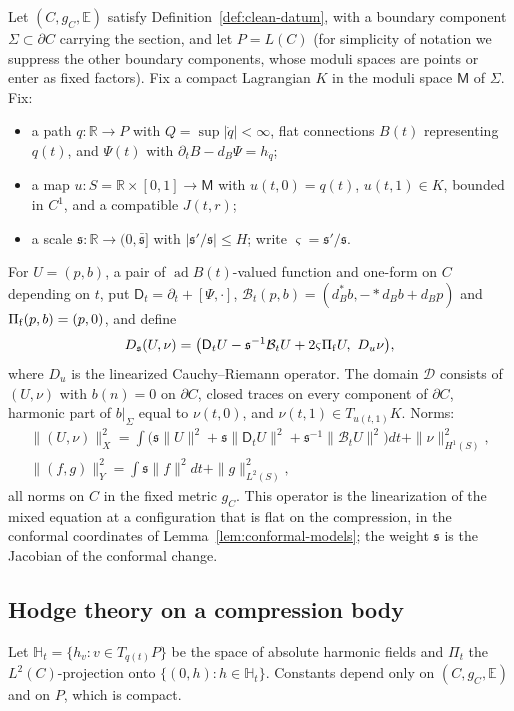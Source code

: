 \documentclass[11pt]{amsart}
\theoremstyle{definition}
\theoremstyle{remark}
\theoremstyle{plain}
\numberwithin{equation}{section}
\newcommand{\RR}{\mathbb{R}}
\newcommand{\ad}{\operatorname{ad}}
\newcommand{\Msf}{\mathsf{M}}
\begin{document}
Let $(C,g_C,\mathbb E)$ satisfy Definition~\ref{def:clean-datum}, with a boundary
component $\Sigma\subset\partial C$ carrying the section, and let $P=L(C)$
(for simplicity of notation we suppress the other boundary components,
whose moduli spaces are points or enter as fixed factors). Fix a
compact Lagrangian $K$ in the moduli space $\Msf$ of $\Sigma$. Fix:
\begin{itemize}[leftmargin=2em]
\item a path $q\colon\RR\to P$ with $Q=\sup|\dot q|<\infty$, flat
  connections $B(t)$ representing $q(t)$, and $\Psi(t)$ with
  $\partial_tB-d_B\Psi=h_{\dot q}$;
\item a map $u\colon S=\RR\times[0,1]\to\Msf$ with $u(t,0)=q(t)$,
  $u(t,1)\in K$, bounded in $C^1$, and a compatible $J(t,r)$;
\item a scale ${\mathfrak s}\colon\RR\to(0,\bar{\mathfrak s}]$ with $|{\mathfrak s}'/{\mathfrak s}|\le H$;
  write $\varsigma={\mathfrak s}'/{\mathfrak s}$.
\end{itemize}
For $U=(p,b)$, a pair of $\ad B(t)$-valued function and one-form on $C$
depending on $t$, put $\mathsf D_t=\partial_t+[\Psi,\cdot]$,
$\mathcal B_t(p,b)=(d_B^*b,-*d_Bb+d_Bp)$ and $\Pi_{\rm f}(p,b)=(p,0)$, and
define
\[
D_{\mathfrak s}(U,\nu)=\bigl(\mathsf D_tU-{\mathfrak s}^{-1}\mathcal B_tU+2\varsigma\Pi_{\rm f}U,\
D_u\nu\bigr),
\]
where $D_u$ is the linearized Cauchy--Riemann operator. The domain
$\mathcal D$ consists of $(U,\nu)$ with $b(n)=0$ on $\partial C$, closed
traces on every component of $\partial C$, harmonic part of
$b|_\Sigma$ equal to $\nu(t,0)$, and $\nu(t,1)\in T_{u(t,1)}K$. Norms:
\begin{gather*}
\|(U,\nu)\|_X^2=\int\bigl({\mathfrak s}\|U\|^2+{\mathfrak s}\|\mathsf D_tU\|^2
+{\mathfrak s}^{-1}\|\mathcal B_tU\|^2\bigr)dt+\|\nu\|^2_{H^1(S)},\\
\|(f,g)\|_Y^2=\int{\mathfrak s}\|f\|^2dt+\|g\|^2_{L^2(S)},
\end{gather*}
all norms on $C$ in the fixed metric $g_C$. This operator is the
linearization of the mixed equation at a configuration that is flat on
the compression, in the conformal coordinates of
Lemma~\ref{lem:conformal-models}; the weight ${\mathfrak s}$ is the Jacobian of
the conformal change.

\subsection{Hodge theory on a compression body}

Let $\mathbb H_t=\{h_v:v\in T_{q(t)}P\}$ be the space of absolute
harmonic fields and $\Pi_t$ the $L^2(C)$-projection onto
$\{(0,h):h\in\mathbb H_t\}$. Constants depend only on $(C,g_C,\mathbb E)$ and on
$P$, which is compact.
\end{document}
